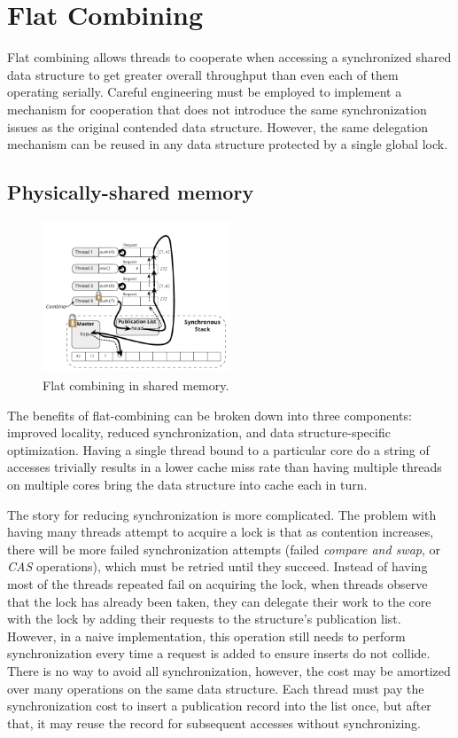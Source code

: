 \section{Flat Combining}

Flat combining allows threads to cooperate when accessing a synchronized shared data structure to get greater overall throughput than even each of them operating serially. Careful engineering must be employed to implement a mechanism for cooperation that does not introduce the same synchronization issues as the original contended data structure. However, the same delegation mechanism can be reused in any data structure protected by a single global lock. 

\subsection{Physically-shared memory}

\begin{figure}[ht]
  \centering
  \includegraphics[width=0.5\textwidth]{figs/fc_shared_mem.pdf}
  \caption{Flat combining in shared memory. }
  \label{fig:fc_shared_mem}
\end{figure}

The benefits of flat-combining can be broken down into three components: improved locality, reduced synchronization, and data structure-specific optimization. Having a single thread bound to a particular core do a string of accesses trivially results in a lower cache miss rate than having multiple threads on multiple cores bring the data structure into cache each in turn.

The story for reducing synchronization is more complicated. The problem with having many threads attempt to acquire a lock is that as contention increases, there will be more failed synchronization attempts (failed \emph{compare and swap}, or \emph{CAS} operations), which must be retried until they succeed.
Instead of having most of the threads repeated fail on acquiring the lock, when threads observe that the lock has already been taken, they can delegate their work to the core with the lock by adding their requests to the structure's publication list. However, in a naive implementation, this operation still needs to perform synchronization every time a request is added to ensure inserts do not collide.
There is no way to avoid all synchronization, however, the cost may be amortized over many operations on the same data structure. Each thread must pay the synchronization cost to insert a publication record into the list once, but after that, it may reuse the record for subsequent accesses without synchronizing.

